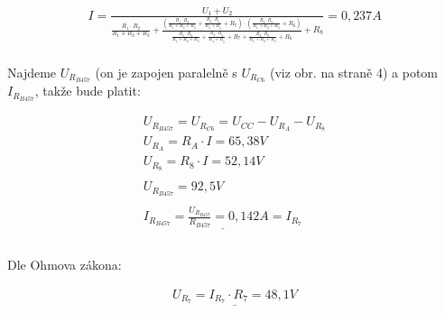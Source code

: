 \begin{align*}
	 I = \frac {U_1 + U_2}{  \frac {R_1 \cdot R_2}{R_1 + R_2 + R_3} + 
	\frac
	{( \frac {R_1 \cdot R_3}{R_1 + R_2 + R_3} + \frac {R_4 \cdot R_5}{R_4 + R_5} +R_7) \cdot (\frac {R_2 \cdot R_3}{R_1 + R_2 + R_3} + R_6)}
	{\frac {R_1 \cdot R_3}{R_1 + R_2 + R_3} + \frac {R_4 \cdot R_5}{R_4 + R_5} +R_7 + \frac {R_2 \cdot R_3}{R_1 + R_2 + R_3} + R_6} + R_8 } = 0,237 A\\
\end{align*}

\begin{center}
	{Najdeme $U_{R_{B457}} $ (on je zapojen paralelně s $U_{R_{C6}}$ (viz obr. na straně 4) a potom $I_{R_{B457}}$, takže bude platit: }
\end{center}

\begin{align*}
	U_{R_{B457}} = U_{R_{C6}} = U_{CC} - U_{R_{A}} - U_{R_{8}}\\
	U_{R_{A}} = R_{A} \cdot I = 65,38 V\\
	U_{R_{8}} = R_{8} \cdot I = 52,14 V\\
	\\
	U_{R_{B457}}  = 92,5 V\\
	\\
	\underline{ I_{R_{B457}} = \frac {U_{R_{B457}}}{R_{B457}} = 0,142 A = I_{R_{7}}}\\
	\\
\end{align*}

\begin{center}
	{Dle Ohmova zákona: }
\end{center}

\begin{align*}
	\underline{U_{R_{7}} = I_{R_{7}} \cdot R_{7} = 48,1 V}
\end{align*}


